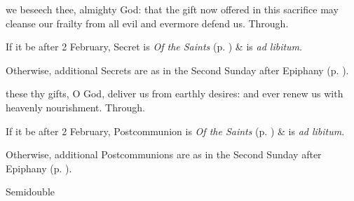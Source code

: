 \vspace{-2ex}
\secret
{} we beseech thee, almighty God: that the gift now offered in this sacrifice may cleanse our frailty from all evil and evermore defend us. Through.
\begin{rubric}
    If it be after 2 February,  Secret is \emph{Of the Saints} (p. \pageref{SPSaints}) \&  is \emph{ad libitum}.\par
    Otherwise, additional Secrets are as in the Second Sunday after Epiphany (p. \pageref{EpiphanyII}).
\end{rubric}
\postcommunion
{} these thy gifts, O God, deliver us from earthly desires: and ever renew us with heavenly nourishment. Through.
\begin{rubric}
    If it be after 2 February,  Postcommunion is \emph{Of the Saints} (p. \pageref{SPSaints}) \&  is \emph{ad libitum}.\par
    Otherwise, additional Postcommunions are as in the Second Sunday after Epiphany (p. \pageref{EpiphanyII}).
\end{rubric}


\label{EpiphanyV}
\begin{inhead}
{Semidouble}
\end{inhead}
\par\noindent
{}


